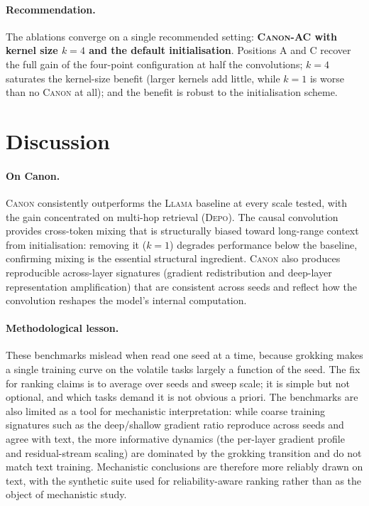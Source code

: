 \documentclass[11pt]{article}
\newcommand{\Canon}{\textsc{Canon}\xspace}
\newcommand{\Llama}{\textsc{Llama}\xspace}
\newcommand{\Depo}{\textsc{Depo}\xspace}
\begin{document}
\paragraph{Recommendation.}
The ablations converge on a single recommended setting: \textbf{\Canon-AC with kernel size
$k{=}4$ and the default initialisation}. Positions A and C recover the full gain of the
four-point configuration at half the convolutions; $k{=}4$ saturates the kernel-size benefit
(larger kernels add little, while $k{=}1$ is worse than no \Canon at all); and the benefit is
robust to the initialisation scheme.

\section{Discussion}

\paragraph{On Canon.}
\Canon consistently outperforms the \Llama baseline at every scale tested, with the gain
concentrated on multi-hop retrieval (\Depo). The causal convolution provides cross-token
mixing that is structurally biased toward long-range context from initialisation: removing
it ($k{=}1$) degrades performance below the baseline, confirming mixing is the essential
structural ingredient. \Canon also produces reproducible across-layer signatures (gradient
redistribution and deep-layer representation amplification) that are consistent across
seeds and reflect how the convolution reshapes the model's internal computation.

\paragraph{Methodological lesson.}
These benchmarks mislead when read one seed at a time, because grokking makes a single training
curve on the volatile tasks largely a function of the seed. The fix for ranking claims is
to average over seeds and sweep scale; it is simple but not optional, and which tasks
demand it is not obvious a priori. The benchmarks are also limited as a tool for mechanistic
interpretation: while coarse training signatures such as the deep/shallow gradient ratio
reproduce across seeds and agree with text, the more informative dynamics (the per-layer
gradient profile and residual-stream scaling) are dominated by the grokking transition and do
not match text training. Mechanistic conclusions are therefore more reliably drawn on text,
with the synthetic suite used for reliability-aware ranking rather than as the object of
mechanistic study.
\end{document}
